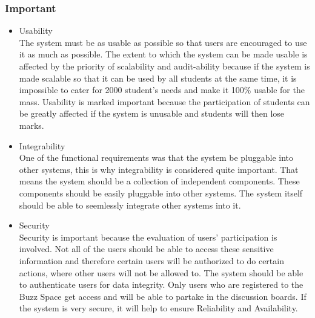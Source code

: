 	\subsubsection{Important}
		\begin{itemize}
			\item Usability \\
			The system must be as usable as possible so that users are encouraged to use it as much as possible. The extent to which the system can be made usable is affected by the priority of scalability and audit-ability because if the system is made scalable so that it can be used by all students at the same time, it is impossible to cater for 2000 student's needs and make it 100\% usable for the mass. Usability is marked important because the participation of students can be greatly affected if the system is unusable and students will then lose marks.

			\item Integrability \\
			One of the functional requirements was that the system be pluggable into other systems, this is why integrability is considered quite important. That means the system should be a collection of independent components. These components should be easily pluggable into other systems. The system itself should be able to seemlessly integrate other systems into it.
			\item Security \\
			Security is important because the evaluation of users' participation is involved. Not all of the users should be able to access these sensitive information and therefore certain users will be authorized to do certain actions, where other users will not be allowed to. The system should be able to authenticate users for data integrity. Only users who are registered to the Buzz Space get access and will be able to partake in the discussion boards. If the system is very secure, it will help to ensure Reliability and Availability.
		\end{itemize}
